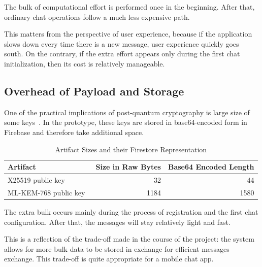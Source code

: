 The bulk of computational effort is performed once in the beginning. After that, ordinary chat operations follow a much less expensive path.

This matters from the perspective of user experience, because if the application slows down every time there is a new message, user experience quickly goes south. On the contrary, if the extra effort appears only during the first chat initialization, then its cost is relatively manageable.

\subsection{Overhead of Payload and Storage}
One of the practical implications of post-quantum cryptography is large size of some keys~\cite{fips203}. In the prototype, these keys are stored in base64-encoded form in Firebase and therefore take additional space.

\begin{table}[htbp]
\centering
\caption{Artifact Sizes and their Firestore Representation}
\label{tab:size}
\small
\setlength{\tabcolsep}{4pt}
\begin{tabularx}{\columnwidth}{@{}X r r@{}}
\toprule
\textbf{Artifact} & \textbf{Size in Raw Bytes} & \textbf{Base64 Encoded Length} \\
\midrule
X25519 public key~\cite{rfc7748} & 32 & 44 \\
ML-KEM-768 public key~\cite{fips203} & 1184 & 1580 \\
\bottomrule
\end{tabularx}
\end{table}
The extra bulk occurs mainly during the process of registration and the first chat configuration.
After that, the messages will stay relatively light and fast.

This is a reflection of the trade-off made in the course of the project: the system allows for more bulk data to be stored in exchange for efficient messages exchange. This trade-off is quite appropriate for a mobile chat app.